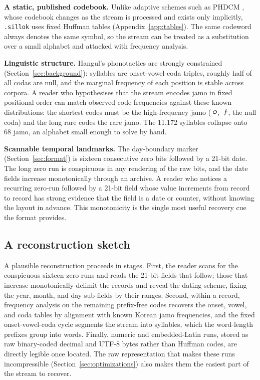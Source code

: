 \documentclass[conference]{IEEEtran}
\begin{document}
\textbf{A static, published codebook.} Unlike adaptive schemes such as PHDCM
\cite{phdcm}, whose codebook changes as the stream is processed and exists only
implicitly, \texttt{.sillok} uses fixed Huffman tables (Appendix~\ref{app:tables}).
The same codeword always denotes the same symbol, so the stream can be treated
as a substitution over a small alphabet and attacked with frequency analysis.

\textbf{Linguistic structure.} Hangul's phonotactics are strongly constrained
(Section~\ref{sec:background}): syllables are onset-vowel-coda triples, roughly
half of all codas are null, and the marginal frequency of each position is
stable across corpora. A reader who hypothesises that the stream encodes jamo in
fixed positional order can match observed code frequencies against these known
distributions: the shortest codes must be the high-frequency jamo (\emph{ㅇ},
\emph{ㅏ}, the null coda) and the long rare codes the rare jamo. The 11,172
syllables collapse onto 68 jamo, an alphabet small enough to solve by hand.

\textbf{Scannable temporal landmarks.} The day-boundary marker
(Section~\ref{sec:format}) is sixteen consecutive zero bits followed by a 21-bit
date. The long zero run is conspicuous in any rendering of the raw bits, and the
date fields increase monotonically through an archive. A reader who notices a
recurring zero-run followed by a 21-bit field whose value increments from record
to record has strong evidence that the field is a date or counter, without
knowing the layout in advance. This monotonicity is the single most useful
recovery cue the format provides.

\subsection{A reconstruction sketch}

A plausible reconstruction proceeds in stages. First, the reader scans for the
conspicuous sixteen-zero runs and reads the 21-bit fields that follow; those
that increase monotonically delimit the records and reveal the dating scheme,
fixing the year, month, and day sub-fields by their ranges. Second, within a
record, frequency analysis on the remaining prefix-free codes recovers the
onset, vowel, and coda tables by alignment with known Korean jamo frequencies,
and the fixed onset-vowel-coda cycle segments the stream into syllables, which
the word-length prefixes group into words. Finally, numeric and embedded-Latin
runs, stored as raw binary-coded decimal and UTF-8 bytes rather than Huffman
codes, are directly legible once located. The raw representation that makes
these runs incompressible (Section~\ref{sec:optimizations}) also makes them the
easiest part of the stream to recover.
\end{document}
